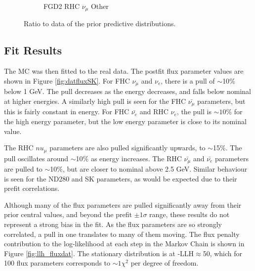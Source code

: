 \begin{figure}
\begin{subfigure}{.32\textwidth}
  \caption{FGD2 RHC $\nu_{\mu}$ Other}
  \label{fig:priorpred_FGD2_NuMuBkg_CCOther_in_AntiNu_Mode}
\end{subfigure}
\caption{Ratio to data of the prior predictive distributions.}
\label{fig:priorpreds}
\end{figure}

\subsection{Fit Results}

The MC was then fitted to the real data. The postfit flux parameter values are shown in Figure \ref{fig:datfluxSK}. For FHC $\nu_{\mu}$ and $\nu_e$, there is a pull of $\sim$10$\%$ below 1 GeV. The pull decreases as the energy decreases, and falls below nominal at higher energies. A similarly high pull is seen for the FHC $\bar{\nu_{\mu}}$ parameters, but this is fairly constant in energy. For FHC $\bar{\nu_e}$ and RHC $\nu_e$, the pull is $\sim10\%$ for the high energy parameter, but the low energy parameter is close to its nominal value.

The RHC $nu_{\mu}$ parameters are also pulled significantly upwards, to $\sim$15$\%$. The pull oscillates around $\sim$10$\%$ as energy increases. The RHC $\bar{\nu_{\mu}}$ and $\bar{\nu_{e}}$ parameters are pulled to $\sim$10$\%$, but are closer to nominal above 2.5 GeV. Similar behaviour is seen for the ND280 and SK parameters, as would be expected due to their prefit correlations.

Although many of the flux parameters are pulled significantly away from their prior central values, and beyond the prefit $\pm1\sigma$ range, these results do not represent a strong bias in the fit. As the flux parameters are so strongly correlated, a pull in one translates to many of them moving. The flux penalty contribution to the log-likelihood at each step in the Markov Chain is shown in Figure \ref{fig:llh_fluxdat}. The stationary distribution is at -LLH$\approx$50, which for 100 flux parameters corresponds to $\sim1\chi^2$ per degree of freedom.

